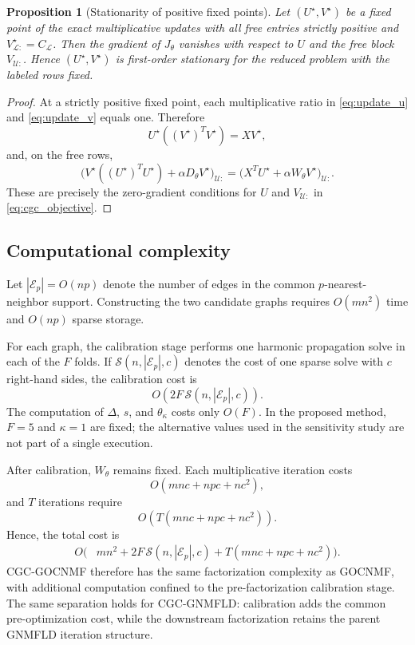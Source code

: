\documentclass[11pt]{article}
\newtheorem{proposition}{Proposition}
\theoremstyle{remark}
\begin{document}
\begin{proposition}[Stationarity of positive fixed points]
\label{prop:fixed_stationarity}
Let $(U^\star,V^\star)$ be a fixed point of the exact multiplicative updates with all free entries strictly positive and $V^\star_{\mathcal L:}=C_{\mathcal L}$. Then the gradient of $J_\theta$ vanishes with respect to $U$ and the free block $V_{\mathcal U:}$. Hence $(U^\star,V^\star)$ is first-order stationary for the reduced problem with the labeled rows fixed.
\end{proposition}

\begin{proof}
At a strictly positive fixed point, each multiplicative ratio in \eqref{eq:update_u} and \eqref{eq:update_v} equals one. Therefore
\[
U^\star((V^\star)^TV^\star)=XV^\star,
\]
and, on the free rows,
\[
\bigl(V^\star((U^\star)^TU^\star)+\alpha D_\theta V^\star\bigr)_{\mathcal U:}
=
\bigl(X^TU^\star+\alpha W_\theta V^\star\bigr)_{\mathcal U:}.
\]
These are precisely the zero-gradient conditions for $U$ and $V_{\mathcal U:}$ in \eqref{eq:cgc_objective}.
\end{proof}

\subsection{Computational complexity}

Let $|\mathcal E_p|=O(np)$ denote the number of edges in the common $p$-nearest-neighbor support. Constructing the two candidate graphs requires $O(mn^2)$ time and $O(np)$ sparse storage.

For each graph, the calibration stage performs one harmonic propagation solve in each of the $F$ folds. If $\mathcal S(n,|\mathcal E_p|,c)$ denotes the cost of one sparse solve with $c$ right-hand sides, the calibration cost is
\[
O\!\left(2F\,\mathcal S(n,|\mathcal E_p|,c)\right).
\]
The computation of $\Delta$, $s$, and $\theta_{\kappa}$ costs only $O(F)$. In the proposed method, $F=5$ and $\kappa=1$ are fixed; the alternative values used in the sensitivity study are not part of a single execution.

After calibration, $W_{\theta}$ remains fixed. Each multiplicative iteration costs
\[
O(mnc+npc+nc^2),
\]
and $T$ iterations require
\[
O\!\left(T(mnc+npc+nc^2)\right).
\]
Hence, the total cost is
\[
\begin{aligned}
O\!\bigl(&mn^2+2F\,\mathcal S(n,|\mathcal E_p|,c)
+T(mnc+npc+nc^2)\bigr).
\end{aligned}
\]
CGC-GOCNMF therefore has the same factorization complexity as GOCNMF, with additional computation confined to the pre-factorization calibration stage. The same separation holds for CGC-GNMFLD: calibration adds the common pre-optimization cost, while the downstream factorization retains the parent GNMFLD iteration structure.
\end{document}
